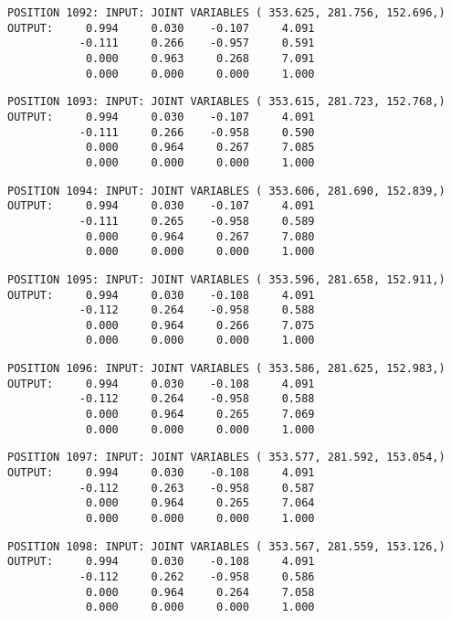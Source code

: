 \begin{verbatim}
POSITION 1092: INPUT: JOINT VARIABLES ( 353.625, 281.756, 152.696,)
OUTPUT:     0.994     0.030    -0.107     4.091
           -0.111     0.266    -0.957     0.591
            0.000     0.963     0.268     7.091
            0.000     0.000     0.000     1.000
\end{verbatim} \pagebreak[1]\begin{verbatim}
POSITION 1093: INPUT: JOINT VARIABLES ( 353.615, 281.723, 152.768,)
OUTPUT:     0.994     0.030    -0.107     4.091
           -0.111     0.266    -0.958     0.590
            0.000     0.964     0.267     7.085
            0.000     0.000     0.000     1.000
\end{verbatim} \pagebreak[1]\begin{verbatim}
POSITION 1094: INPUT: JOINT VARIABLES ( 353.606, 281.690, 152.839,)
OUTPUT:     0.994     0.030    -0.107     4.091
           -0.111     0.265    -0.958     0.589
            0.000     0.964     0.267     7.080
            0.000     0.000     0.000     1.000
\end{verbatim} \pagebreak[1]\begin{verbatim}
POSITION 1095: INPUT: JOINT VARIABLES ( 353.596, 281.658, 152.911,)
OUTPUT:     0.994     0.030    -0.108     4.091
           -0.112     0.264    -0.958     0.588
            0.000     0.964     0.266     7.075
            0.000     0.000     0.000     1.000
\end{verbatim} \pagebreak[1]\begin{verbatim}
POSITION 1096: INPUT: JOINT VARIABLES ( 353.586, 281.625, 152.983,)
OUTPUT:     0.994     0.030    -0.108     4.091
           -0.112     0.264    -0.958     0.588
            0.000     0.964     0.265     7.069
            0.000     0.000     0.000     1.000
\end{verbatim} \pagebreak[1]\begin{verbatim}
POSITION 1097: INPUT: JOINT VARIABLES ( 353.577, 281.592, 153.054,)
OUTPUT:     0.994     0.030    -0.108     4.091
           -0.112     0.263    -0.958     0.587
            0.000     0.964     0.265     7.064
            0.000     0.000     0.000     1.000
\end{verbatim} \pagebreak[1]\begin{verbatim}
POSITION 1098: INPUT: JOINT VARIABLES ( 353.567, 281.559, 153.126,)
OUTPUT:     0.994     0.030    -0.108     4.091
           -0.112     0.262    -0.958     0.586
            0.000     0.964     0.264     7.058
            0.000     0.000     0.000     1.000
\end{verbatim} \pagebreak[1]\begin{verbatim}

\end{verbatim}
